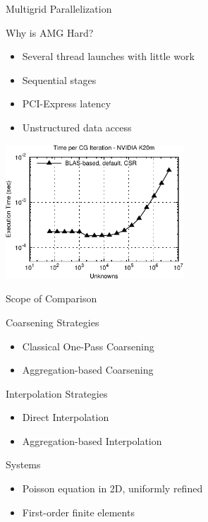 


\begin{frame}{Multigrid Parallelization}

  \begin{block}{Why is AMG Hard?}
  \begin{itemize}
   \item Several thread launches with little work
   \item Sequential stages
   \item PCI-Express latency
   \item Unstructured data access
  \end{itemize}
  \end{block}

  \begin{center}
   \includegraphics[width=0.5\textwidth]{figures/cg-k20m-0.pdf}
  \end{center}

\end{frame}


\begin{frame}{Scope of Comparison}

  \begin{block}{Coarsening Strategies}
  \begin{itemize}
   \item Classical One-Pass Coarsening
   \item Aggregation-based Coarsening
  \end{itemize}
  \end{block}

  \begin{block}{Interpolation Strategies}
  \begin{itemize}
   \item Direct Interpolation
   \item Aggregation-based Interpolation
  \end{itemize}
  \end{block}

  \begin{block}{Systems}
  \begin{itemize}
   \item Poisson equation in 2D, uniformly refined
   \item First-order finite elements
  \end{itemize}
  \end{block}

\end{frame}



